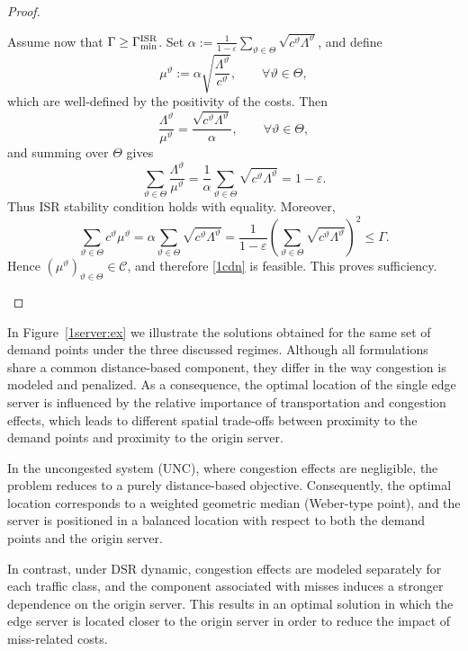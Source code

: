 \documentclass[a4paper,11pt,reqno]{amsart}
\begin{document}
\begin{proof}
\begin{enumerate}[label=\roman*), ref=\roman*]
Assume now that $\Gamma
\ge \Gamma_{\min}^{\rm ISR}$. Set $
\alpha:=
\frac{1}{1-\varepsilon}
\sum_{\vartheta\in\Theta}\sqrt{c^\vartheta\Lambda^\vartheta}$, 
and define
$$
\mu^\vartheta:=\alpha\sqrt{\frac{\Lambda^\vartheta}{c^\vartheta}},
\qquad \forall \vartheta\in\Theta,
$$
which are well-defined by the positivity of the costs. Then
$$
\frac{\Lambda^\vartheta}{\mu^\vartheta}
=
\frac{\sqrt{c^\vartheta\Lambda^\vartheta}}{\alpha},
\qquad \forall \vartheta\in\Theta,
$$
and summing over \(\Theta\) gives
$$
\sum_{\vartheta\in\Theta}\frac{\Lambda^\vartheta}{\mu^\vartheta}
=
\frac{1}{\alpha}\sum_{\vartheta\in\Theta}\sqrt{c^\vartheta\Lambda^\vartheta}
=
1-\varepsilon.
$$
Thus ISR stability condition holds with equality. Moreover,
$$
\sum_{\vartheta\in\Theta} c^\vartheta\mu^\vartheta
=
\alpha\sum_{\vartheta\in\Theta}\sqrt{c^\vartheta\Lambda^\vartheta}
=
\frac{1}{1-\varepsilon}
\left(\sum_{\vartheta\in\Theta}\sqrt{c^\vartheta\Lambda^\vartheta}\right)^2
\le \Gamma.
$$
Hence $(\mu^\vartheta)_{\vartheta\in\Theta}\in\mathcal C$, and therefore \eqref{1cdn} is feasible. This proves sufficiency.

\end{enumerate}
\end{proof}

In Figure~\ref{1server:ex} we illustrate the solutions obtained for the same set of demand points under the three discussed regimes. Although all formulations share a common distance-based component, they differ in the way congestion is modeled and penalized. As a consequence, the optimal location of the single edge server is influenced by the relative importance of transportation and congestion effects, which leads to different spatial trade-offs between proximity to the demand points and proximity to the origin server.

In the uncongested system (UNC), where congestion effects are negligible, the problem reduces to a purely distance-based objective. Consequently, the optimal location corresponds to a weighted geometric median (Weber-type point), and the server is positioned in a balanced location with respect to both the demand points and the origin server.

In contrast, under DSR dynamic, congestion effects are modeled separately for each traffic class, and the component associated with misses induces a stronger dependence on the origin server. This results in an optimal solution in which the edge server is located closer to the origin server in order to reduce the impact of miss-related costs.
\end{document}
